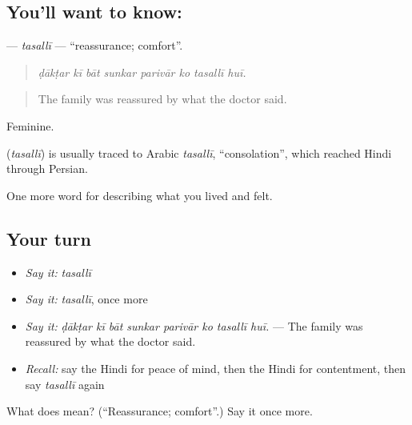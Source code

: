 \subsection*{You'll want to know: }
\textbf{} — \emph{tasallī} — \textquotedblleft{}reassurance; comfort\textquotedblright{}.

\begin{quote}
       
\end{quote}

\begin{quote}
\emph{ḍākṭar kī bāt sunkar parivār ko tasallī huī.}
\end{quote}

\begin{quote}
The family was reassured by what the doctor said.
\end{quote}

Feminine.

\begin{cousinweb}
\textbf{} (\emph{tasallī}) is usually traced to Arabic \emph{tasallī}, \textquotedblleft{}consolation\textquotedblright{}, which reached Hindi through Persian.
\end{cousinweb}

\begin{grammarlens}[title={What you've built}]
One more word for describing what you lived and felt.
\end{grammarlens}

\subsection*{Your turn}
\begin{itemize}
\raggedright
  \item \emph{Say it:} \emph{tasallī}
  \item \emph{Say it:} \emph{tasallī}, once more
  \item \emph{Say it:} \emph{ḍākṭar kī bāt sunkar parivār ko tasallī huī.} — The family was reassured by what the doctor said.
  \item \emph{Recall:} say the Hindi for peace of mind, then the Hindi for contentment, then say \emph{tasallī} again
\end{itemize}

\begin{tcolorbox}[breakable,colback=teal!4,colframe=teal!35!black,title={Before you move on}]
What does  mean? (\textquotedblleft{}Reassurance; comfort\textquotedblright{}.) Say it once more.
\end{tcolorbox}
